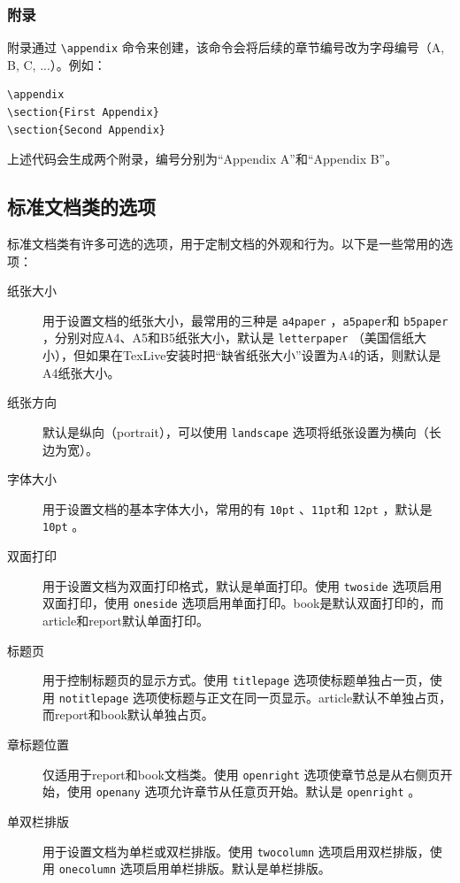 \subsubsection{附录}

附录通过 \verb|\appendix| 命令来创建，该命令会将后续的章节编号改为字母编号（A, B, C, ...）。例如：
\begin{verbatim}
\appendix
\section{First Appendix}
\section{Second Appendix}
\end{verbatim}
上述代码会生成两个附录，编号分别为“Appendix A”和“Appendix B”。

\subsection{标准文档类的选项}

标准文档类有许多可选的选项，用于定制文档的外观和行为。以下是一些常用的选项：
\begin{description}
  \item[纸张大小] 用于设置文档的纸张大小，最常用的三种是 \verb|a4paper| ，\verb|a5paper|和 \verb|b5paper| ，分别对应A4、A5和B5纸张大小，默认是 \verb|letterpaper| （美国信纸大小），但如果在TexLive安装时把“缺省纸张大小”设置为A4的话，则默认是A4纸张大小。
  \item[纸张方向] 默认是纵向（portrait），可以使用 \verb|landscape| 选项将纸张设置为横向（长边为宽）。
  \item[字体大小] 用于设置文档的基本字体大小，常用的有 \verb|10pt| 、\verb|11pt|和 \verb|12pt| ，默认是 \verb|10pt| 。
  \item[双面打印] 用于设置文档为双面打印格式，默认是单面打印。使用 \verb|twoside| 选项启用双面打印，使用 \verb|oneside| 选项启用单面打印。book是默认双面打印的，而article和report默认单面打印。
  \item[标题页] 用于控制标题页的显示方式。使用 \verb|titlepage| 选项使标题单独占一页，使用 \verb|notitlepage| 选项使标题与正文在同一页显示。article默认不单独占页，而report和book默认单独占页。
  \item[章标题位置] 仅适用于report和book文档类。使用 \verb|openright| 选项使章节总是从右侧页开始，使用 \verb|openany| 选项允许章节从任意页开始。默认是 \verb|openright| 。
  \item[单双栏排版] 用于设置文档为单栏或双栏排版。使用 \verb|twocolumn| 选项启用双栏排版，使用 \verb|onecolumn| 选项启用单栏排版。默认是单栏排版。 
\end{description}

